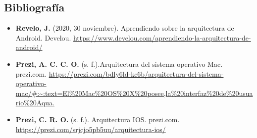 \documentclass[11pt,twoside]{book}
\begin{document}
\subsection*{Bibliografía}
\begin{itemize}
  \item \textbf{Revelo, J.} (2020, 30 noviembre). Aprendiendo sobre la arquitectura de Android. Develou. \url{https://www.develou.com/aprendiendo-la-arquitectura-de-android/}

  \item \textbf{Prezi, A. C. C. O.} (s. f.).Arquitectura del sistema operativo Mac. prezi.com. \url{https://prezi.com/bdly6ld-kc6b/arquitectura-del-sistema-operativo-mac/#:~:text=El%20Mac%20OS%20X%20posee,la%20interfaz%20de%20usuario%20Aqua.}

  \item \textbf{Prezi, C. R. O.} (s. f.). Arquitectura IOS. prezi.com. \url{https://prezi.com/srjcjo5pb5uu/arquitectura-ios/}
\end{itemize}
\end{document}
